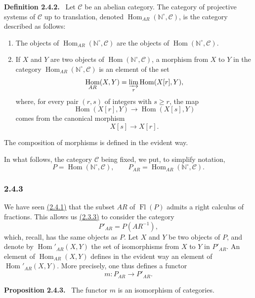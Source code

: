 \documentclass[11pt]{article}
\providecommand{\NN}{\mathbb{N}}
\newenvironment{statement}[1]{\par\medskip\noindent\textbf{#1.}\ }{\par\medskip}
\DeclareMathOperator{\Hom}{Hom}
\providecommand{\Hom}{\operatorname{Hom}}
\providecommand{\Fl}{\operatorname{Fl}}
\providecommand{\NN}{\mathbb N}
\providecommand{\cC}{\mathcal C}
\providecommand{\cC}{\mathcal C}
\providecommand{\Hom}{\operatorname{Hom}}
\begin{document}
\label{sga5:V:definition:2.4.2}\begin{statement}{Definition 2.4.2}
Let $\cC$ be an abelian category. The category of projective systems of $\cC$ up to translation, denoted $\Hom_{AR}(\NN^\circ,\cC)$, is the category described as follows:
\begin{enumerate}[label=(\roman*)]
\item The objects of $\Hom_{AR}(\NN^\circ,\cC)$ are the objects of $\Hom(\NN^\circ,\cC)$.
\item If $X$ and $Y$ are two objects of $\Hom(\NN^\circ,\cC)$, a morphism from $X$ to $Y$ in the category $\Hom_{AR}(\NN^\circ,\cC)$ is an element of the set
\[
\Hom_{AR}(X,Y)=\varinjlim_r\Hom(X[r],Y),
\]
where, for every pair $(r,s)$ of integers with $s\ge r$, the map
\[
\Hom(X[r],Y)\longrightarrow\Hom(X[s],Y)
\]
comes from the canonical morphism
\[
X[s]\longrightarrow X[r].
\]
\end{enumerate}
The composition of morphisms is defined in the evident way.
\end{statement}
In what follows, the category $\cC$ being fixed, we put, to simplify notation,
\[
P=\Hom(\NN^\circ,\cC),\qquad P_{AR}=\Hom_{AR}(\NN^\circ,\cC).
\]

\subsubsection*{2.4.3}\label{sga5:V:subsubsection:2.4.3}
We have seen \hyperref[sga5:V:proposition:2.4.1]{(2.4.1)} that the subset $AR$ of $\Fl(P)$ admits a right calculus of fractions. This allows us \hyperref[sga5:V:subsubsection:2.3.3]{(2.3.3)} to consider the category
\[
P'_{AR}=P(AR^{-1}),
\]
which, recall, has the same objects as $P$. Let $X$ and $Y$ be two objects of $P$, and denote by $\Hom'_{AR}(X,Y)$ the set of isomorphisms from $X$ to $Y$ in $P'_{AR}$. An element of $\Hom_{AR}(X,Y)$ defines in the evident way an element of $\Hom'_{AR}(X,Y)$. More precisely, one thus defines a functor
\[
m:P_{AR}\longrightarrow P'_{AR}.
\]

\label{sga5:V:proposition:2.4.3}\begin{statement}{Proposition 2.4.3}
The functor $m$ is an isomorphism of categories.
\end{statement}
\end{document}
